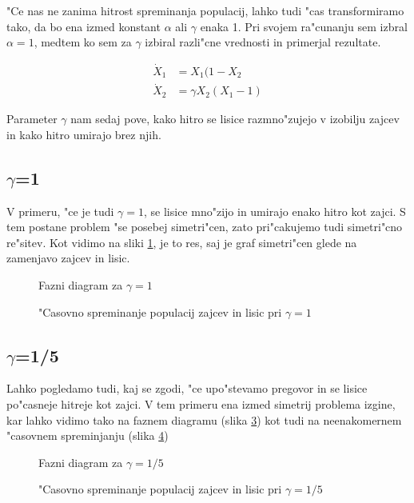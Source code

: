 \documentclass[a4paper,10pt]{article}
\begin{document}
"Ce nas ne zanima hitrost spreminanja populacij, lahko tudi "cas transformiramo tako, da bo ena izmed konstant $\alpha$ ali $\gamma$ enaka 1. Pri svojem ra"cunanju sem izbral $\alpha=1$, medtem ko sem za $\gamma$ izbiral razli"cne vrednosti in primerjal rezultate. 

\begin{align}
  \dot X_1 &= X_1 ( 1 - X_2 \\
  \dot X_2 &= \gamma X_2 ( X_1 - 1 )
\end{align}

Parameter $\gamma$ nam sedaj pove, kako hitro se lisice razmno"zujejo v izobilju zajcev in kako hitro umirajo brez njih. 

\subsection{\texorpdfstring{$\gamma$}{gama}=1}

V primeru, "ce je tudi $\gamma=1$, se lisice mno"zijo in umirajo enako hitro kot zajci. S tem postane problem "se posebej simetri"cen, zato pri"cakujemo tudi simetri"cno re"sitev. Kot vidimo na sliki \ref{fig:z-f-1}, je to res, saj je graf simetri"cen glede na zamenjavo zajcev in lisic. 
\begin{figure}[!h]
  
  \caption{Fazni diagram za $\gamma=1$}
  \label{fig:z-f-1}
\end{figure}
\begin{figure}[!h]
  
  \caption{"Casovno spreminanje populacij zajcev in lisic pri $\gamma=1$}
  \label{fig:z-t-1}
\end{figure}

\newpage
\subsection{\texorpdfstring{$\gamma$}{gama}=1/5}

Lahko pogledamo tudi, kaj se zgodi, "ce upo"stevamo pregovor in se lisice po"casneje hitreje kot zajci. V tem primeru ena izmed simetrij problema izgine, kar lahko vidimo tako na faznem diagramu (slika \ref{fig:z-f-2}) kot tudi na neenakomernem "casovnem spreminjanju (slika \ref{fig:z-t-2})

\begin{figure}[!h]
  
  \caption{Fazni diagram za $\gamma=1/5$}
  \label{fig:z-f-2}
\end{figure}
\begin{figure}[!h]
  
  \caption{"Casovno spreminanje populacij zajcev in lisic pri $\gamma=1/5$}
  \label{fig:z-t-2}
\end{figure}
\end{document}
